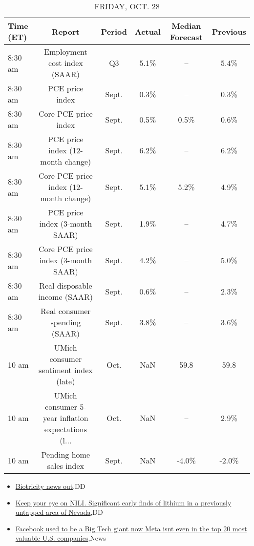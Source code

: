 \documentclass{article}%
\begin{document}
\begin{table}[htbp]%
\caption{FRIDAY, OCT. 28}%
\centering%
\begin{adjustbox}{width=1\textwidth}%
\begin{tabular}{lccccc}
\toprule
Time (ET) &                                             Report & Period & Actual & Median Forecast & Previous \\
\midrule
  8:30 am &                       Employment cost index (SAAR) &     Q3 &   5.1\% &              -- &     5.4\% \\
  8:30 am &                                    PCE price index &  Sept. &   0.3\% &              -- &     0.3\% \\
  8:30 am &                               Core PCE price index &  Sept. &   0.5\% &            0.5\% &     0.6\% \\
  8:30 am &                  PCE price index (12-month change) &  Sept. &   6.2\% &              -- &     6.2\% \\
  8:30 am &             Core PCE price index (12-month change) &  Sept. &   5.1\% &            5.2\% &     4.9\% \\
  8:30 am &                     PCE price index (3-month SAAR) &  Sept. &   1.9\% &              -- &     4.7\% \\
  8:30 am &                Core PCE price index (3-month SAAR) &  Sept. &   4.2\% &              -- &     5.0\% \\
  8:30 am &                      Real disposable income (SAAR) &  Sept. &   0.6\% &              -- &     2.3\% \\
  8:30 am &                      Real consumer spending (SAAR) &  Sept. &   3.8\% &              -- &     3.6\% \\
    10 am &              UMich consumer sentiment index (late) &   Oct. &    NaN &            59.8 &     59.8 \\
    10 am & UMich consumer 5-year inflation expectations (l... &   Oct. &    NaN &              -- &     2.9\% \\
    10 am &                           Pending home sales index &  Sept. &    NaN &           -4.0\% &    -2.0\% \\
\bottomrule
\end{tabular}
%
\end{adjustbox}%
\end{table}

%
\begin{itemize}%
\item%
\href{https://reddit.com/r/Baystreetbets/comments/yf3pol/biotricity\_news\_out/}{Biotricity news out},DD%
\item%
\href{https://reddit.com/r/Baystreetbets/comments/yevsih/keep\_your\_eye\_on\_nili\_significant\_early\_finds\_of/}{Keep your eye on NILI. Significant early finds of lithium in a previously untapped area of Nevada},DD%
\item%
\href{https://reddit.com/r/Economics/comments/yfjcmc/facebook\_used\_to\_be\_a\_big\_tech\_giant\_now\_meta/}{Facebook used to be a Big Tech giant  now Meta isnt even in the top 20 most valuable U.S. companies},News%
\end{itemize}%
\end{document}
